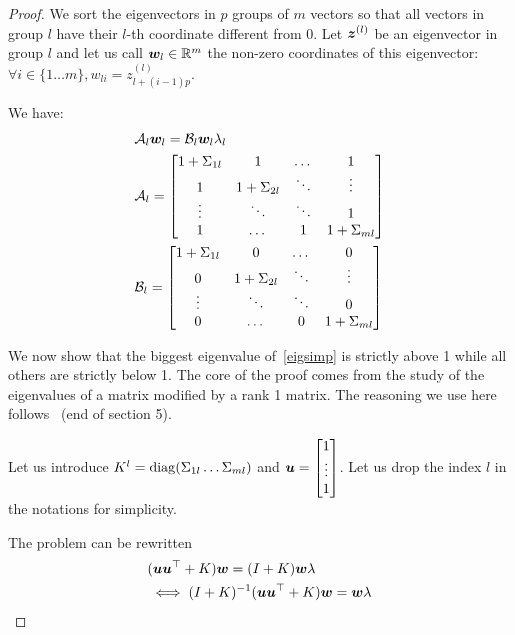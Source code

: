 \begin{proof}
We sort the eigenvectors in $p$ groups of $m$ vectors so that all
vectors in group $l$ have their $l$-th coordinate
different from 0.
Let $\boldsymbol{z}^{(l)}$ be an eigenvector in group $l$ and let us call $\boldsymbol{w}_l \in
\mathbb{R}^{m}$ the non-zero coordinates of this eigenvector: $\forall i \in \{1 \dots m \}, w_{li} = z^{(l)}_{l + (i-1)p}$.

We have:
\begin{align}
  &\mathcal{A}_l
\boldsymbol{w}_l =  \mathcal{B}_l \boldsymbol{w}_l \lambda_l
\label{eigsimp}
  \\ \nonumber
                  & \mathcal{A}_l = \begin{bmatrix}
                    1 + \Sigma_{1l} & 1 & \dots & 1  \\
                    1 & 1 + \Sigma_{2l} & \ddots  &\vdots \\
                    \vdots & \ddots & \ddots & 1  \\
                    1 & \dots & 1 & 1 + \Sigma_{ml}  \\
                  \end{bmatrix}  \\
  & \nonumber \mathcal{B}_l = \begin{bmatrix}
                    1 + \Sigma_{1l} & 0 & \dots  & 0 \\
                    0 & 1 + \Sigma_{2l} & \ddots & \vdots \\
                    \vdots & \ddots & \ddots & 0 \\
                    0& \dots  & 0 &  1 + \Sigma_{ml} 
                  \end{bmatrix} 
\end{align}

We now show that the biggest eigenvalue of~\eqref{eigsimp} is strictly above 1 while all
others are strictly below 1. The core of the proof comes from the study of the eigenvalues of a matrix modified by a rank 1 matrix. The reasoning we use here follows~\cite{golub1973some} (end of section 5).

Let us introduce 
$K^l = \operatorname*{diag}(\Sigma_{1l} \dots \Sigma_{ml})$ and $\boldsymbol{u} = \begin{bmatrix} 1 \\ \vdots \\ 1 \end{bmatrix}$.
Let us drop the index $l$ in the notations for simplicity.

The problem can be rewritten
\begin{align}
  &(\boldsymbol{u} \boldsymbol{u}^{\top} + K) \boldsymbol{w} =  (I + K) \boldsymbol{w} \lambda \\
  & \iff (I + K)^{-1}(\boldsymbol{u} \boldsymbol{u}^{\top} + K) \boldsymbol{w} =   \boldsymbol{w} \lambda
\end{align}


\end{proof}
